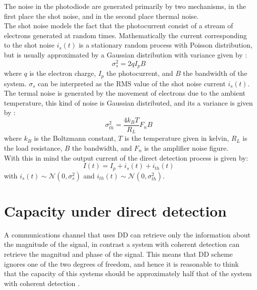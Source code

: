 The noise in the photodiode are generated primarily by two mechanisms, in the first place the shot noise, and in the second place thermal noise.\\

The shot noise models the fact that the photocurrent consist of a stream of electrons generated at random times. Mathematically the current corresponding to the shot noise $i_s(t)$ is a stationary random process with Poisson distribution, but is usually approximated by a Gaussian distribution with variance given by \cite{Agrawal_ch4}:
\begin{equation}
\sigma_s^2 = 2qI_pB
\label{eq:shot_noise_varaince}
\end{equation}
where $q$ is the electron charge, $I_p$ the photocurrent, and $B$ the bandwidth of the system. $\sigma_s$ can be interpreted as the RMS value of the shot noise current $i_s(t)$.\\ 

The termal noise is generated by the movement  of electrons due to the ambient temperature, this kind of noise is Gaussian distributed, and its a variance  is given by \cite{Agrawal_ch4}:
\begin{equation}
\sigma_{th}^2 = \frac{4k_BT}{R_L} F_nB
\label{eq:thermal_noise_variance}
\end{equation}
where $k_B$ is the Boltzmann constant, $T$ is the temperature given in kelvin, $R_L$ is the load resistance, $B$ the bandwidth, and $F_n$ is the amplifier noise figure. \\

With this in mind the output current of the direct detection process is given by:
\begin{equation}
I(t) = I_p+i_s(t)+i_{th}(t)
\label{eq:DD_current}
\end{equation}
with $i_s(t)\sim\mathcal{N}(0,\sigma_s^2)$ and $i_{th}(t)\sim\mathcal{N}(0,\sigma_{th}^2)$.



\section{Capacity under direct detection}
\label{sec:capacity_under_direct_detection}

A communications channel that uses DD can retrieve only the information about the magnitude of the signal, in contrast a system with coherent detection can retrieve the magnitud and phase of the signal. This means that DD scheme ignores one of the two degrees of freedom, and hence it is reasonable to think that the capacity of this systems should be approximately half that of the system with coherent detection \cite{Mecozzi_2018, Tasbihi_Tukey, Tasbihi_Capacity}.\\

